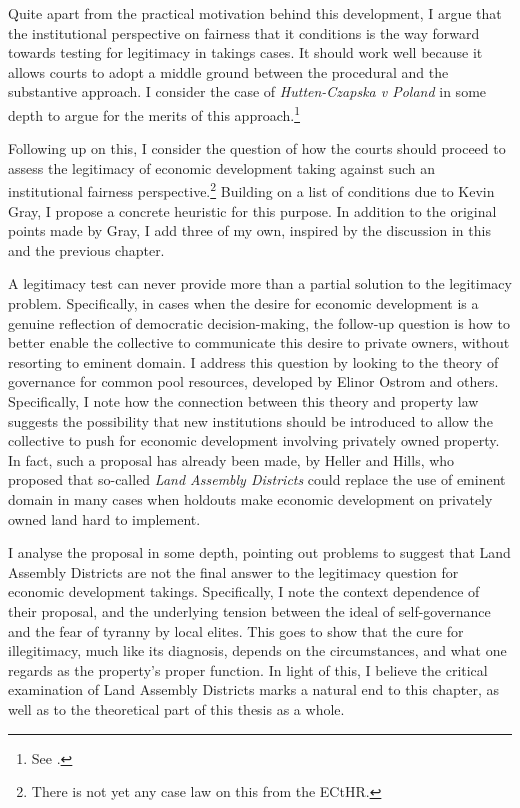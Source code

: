 Quite apart from the practical motivation behind this development, I argue that the institutional perspective on fairness that it conditions is the way forward towards testing for legitimacy in takings cases. It should work well because it allows courts to adopt a middle ground between the procedural and the substantive approach. I consider the case of {\it Hutten-Czapska v Poland} in some depth to argue for the merits of this approach.\footnote{See \cite{hutten06}.}

Following up on this, I consider the question of how the courts should proceed to assess the legitimacy of economic development taking against such an institutional fairness perspective.\footnote{There is not yet any case law on this from the ECtHR.} Building on a list of conditions due to Kevin Gray, I propose a concrete heuristic for this purpose. In addition to the original points made by Gray, I add three of my own, inspired by the discussion in this and the previous chapter. 

A legitimacy test can never provide more than a partial solution to the legitimacy problem. Specifically, in cases when the desire for economic development is a genuine reflection of democratic decision-making, the follow-up question is how to better enable the collective to communicate this desire to private owners, without resorting to eminent domain. I address this question by looking to the theory of governance for common pool resources, developed by Elinor Ostrom and others. Specifically, I note how the connection between this theory and property law suggests the possibility that new institutions should be introduced to allow the collective to push for economic development involving privately owned property. In fact, such a proposal has already been made, by Heller and Hills, who proposed that so-called {\it Land Assembly Districts} could replace the use of eminent domain in many cases when holdouts make economic development on privately owned land hard to implement.  

I analyse the proposal in some depth, pointing out problems to suggest that Land Assembly Districts are not the final answer to the legitimacy question for economic development takings. Specifically, I note the context dependence of their proposal, and the underlying tension between the ideal of self-governance and the fear of tyranny by local elites. This goes to show that the cure for illegitimacy, much like its diagnosis, depends on the circumstances, and what one regards as the property's proper function. In light of this, I believe the critical examination of Land Assembly Districts marks a natural end to this chapter, as well as to the theoretical part of this thesis as a whole.

